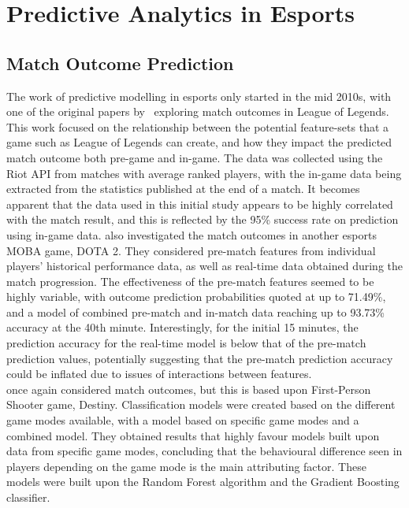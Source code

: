 \section{Predictive Analytics in Esports}\label{sec:PredictiveAnalyticsinEsports}
\subsection{Match Outcome Prediction}\label{subsec:Match Outcome Prediction}
The work of predictive modelling in esports only started in the mid 2010s, with one of the original papers by~\citet{lin2016league} exploring match outcomes in League of Legends.
This work focused on the relationship between the potential feature-sets that a game such as League of Legends can create, and how they impact the predicted match outcome both pre-game and in-game.
The data was collected using the Riot API from matches with average ranked players, with the in-game data being extracted from the statistics published at the end of a match.
It becomes apparent that the data used in this initial study appears to be highly correlated with the match result, and this is reflected by the 95\% success rate on prediction using in-game data.
\citet{yang2016real} also investigated the match outcomes in another esports MOBA game, DOTA 2.
They considered pre-match features from individual players' historical performance data, as well as real-time data obtained during the match progression.
The effectiveness of the pre-match features seemed to be highly variable, with outcome prediction probabilities quoted at up to 71.49\%, and a model of combined pre-match and in-match data reaching up to 93.73\% accuracy at the 40th minute.
Interestingly, for the initial 15 minutes, the prediction accuracy for the real-time model is below that of the pre-match prediction values, potentially suggesting that the pre-match prediction accuracy could be inflated due to issues of interactions between features. \\

\citet{ravari2017predicting} once again considered match outcomes, but this is based upon First-Person Shooter game, Destiny.
Classification models were created based on the different game modes available, with a model based on specific game modes and a combined model.
They obtained results that highly favour models built upon data from specific game modes, concluding that the behavioural difference seen in players depending on the game mode is the main attributing factor.
These models were built upon the Random Forest algorithm and the Gradient Boosting classifier. \\

